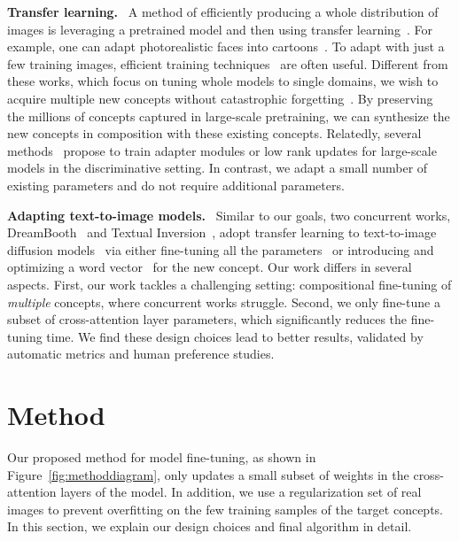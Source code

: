   \textbf{Transfer learning.} \ 
A method of efficiently producing a whole distribution of images is leveraging a pretrained model and then using transfer learning~\cite{wang2018TransferGAN,noguchi2019SB,wang2019MineGAN,mo2020FreezeD,zhao2020leveraging,li2020few,ojha2021few,liu2020towards,gu2021lofgan,nitzan2022mystyle,gal2022stylegan}. For example, one can adapt photorealistic faces into cartoons~\cite{noguchi2019SB,mo2020FreezeD,li2020few,ojha2021few,gal2022stylegan}. To adapt with just a few training images, efficient training techniques~\cite{stylegan2ada,zhao2020image,tran2020towards,diffaug,sauer2021projected,kumari2022ensembling} are often useful. Different from these works, which focus on tuning whole models to single domains, we wish to acquire multiple new concepts without catastrophic forgetting~\cite{french1999catastrophic,kirkpatrick2017overcoming,li2017learning,ramasesh2021effect,li2022overcoming}. By preserving the millions of concepts captured in large-scale pretraining, we can synthesize the new concepts in composition with these existing concepts. Relatedly, several methods~\cite{pfeiffer2020mad,skantze2022collie,gao2021clip,hu2021lora} propose to train adapter modules or low rank updates for large-scale models in the discriminative setting. In contrast, we adapt a small number of existing parameters and do not require additional parameters. 

  \textbf{Adapting text-to-image models.} \  Similar to our goals, two concurrent works, DreamBooth~\cite{ruiz2022dreambooth} and Textual Inversion~\cite{gal2022image}, adopt transfer learning to text-to-image diffusion models~\cite{saharia2022photorealistic,rombach2022high} via either fine-tuning all the parameters~\cite{ruiz2022dreambooth} or introducing and optimizing a word vector~\cite{gal2022image} for the new concept. Our work differs in several aspects. First, our work tackles a challenging setting: compositional fine-tuning of \textit{multiple} concepts, where concurrent works struggle. Second, we only fine-tune a subset of cross-attention layer parameters, which significantly reduces the fine-tuning time. We find these design choices lead to better results, validated by automatic metrics and human preference studies.

\section{Method}\label{sec:method}
Our proposed method for model fine-tuning, as shown in Figure~\ref{fig:methoddiagram}, only updates a small subset of weights in the cross-attention layers of the model. In addition, we use a regularization set of real images to prevent overfitting on the few training samples of the target concepts. In this section, we explain our design choices and final algorithm in detail.

